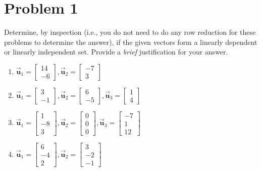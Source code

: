 \documentclass[letter,11pt]{article}
\begin{document}
\section{Problem 1}
Determine, by inspection (i.e., you do not need to do any row reduction for these problems to determine the answer), if the given vectors form a linearly dependent or linearly independent set. Provide a \textit{brief} justification for your answer.
\begin{enumerate}[label = \roman*.]
    \item $\vec{\boldsymbol{u}}_{1}=\begin{bmatrix}14 \\ -6\end{bmatrix}, \vec{\boldsymbol{u}}_{2}=\begin{bmatrix}-7 \\ 3\end{bmatrix}$
    \item $\vec{\boldsymbol{u}}_{1}=\begin{bmatrix}3 \\ -1\end{bmatrix}, \vec{\boldsymbol{u}}_{2}=\begin{bmatrix}6 \\ -5\end{bmatrix}, \vec{\boldsymbol{u}}_{3}=\begin{bmatrix}1 \\ 4\end{bmatrix}$
    \item $\vec{\boldsymbol{u}}_{1}=\begin{bmatrix}1 \\ -8 \\ 3\end{bmatrix}, \vec{\boldsymbol{u}}_{2}=\begin{bmatrix}0 \\ 0 \\ 0\end{bmatrix}, \vec{\boldsymbol{u}}_{3}=\begin{bmatrix}-7 \\ 1 \\ 12\end{bmatrix}$
    \item $\vec{\boldsymbol{u}}_{1}=\begin{bmatrix}6 \\ -4 \\ 2\end{bmatrix}, \vec{\boldsymbol{u}}_{2}=\begin{bmatrix}3 \\ -2 \\ -1\end{bmatrix}$ 
\end{enumerate}
\end{document}
